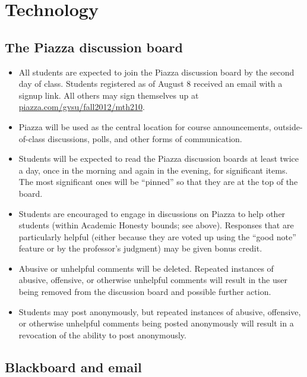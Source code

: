 \documentclass[11pt]{article}
\begin{document}
\section{Technology}

\subsection{The Piazza discussion board}

\begin{itemize}[itemsep=0pt]
	\item All students are expected to join the Piazza discussion board by the second day of class. Students registered as of August 8 received an email with a signup link. All others may sign themselves up at \url{piazza.com/gvsu/fall2012/mth210}.
	\item Piazza will be used as the central location for course announcements, outside-of-class discussions, polls, and other forms of communication. 
	\item Students will be expected to read the Piazza discussion boards at least twice a day, once in the morning and again in the evening, for significant items. The most significant ones will be ``pinned'' so that they are at the top of the board. 
	\item Students are encouraged to engage in discussions on Piazza to help other students (within Academic Honesty bounds; see above). Responses that are particularly helpful (either because they are voted up using the ``good note'' feature or by the professor's judgment) may be given bonus credit. 
	\item Abusive or unhelpful comments will be deleted. Repeated instances of abusive, offensive, or otherwise unhelpful comments will result in the user being removed from the discussion board and possible further action. 
	\item Students may post anonymously, but repeated instances of abusive, offensive, or otherwise unhelpful comments being posted anonymously will result in a revocation of the ability to post anonymously. 
\end{itemize}


\subsection{Blackboard and email}
\end{document}
